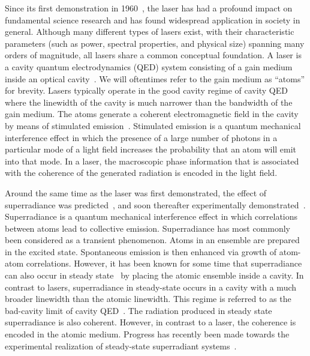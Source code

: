 \documentclass[aps,
twocolumn,
showpacs,
superscriptaddress,groupedaddress]{revtex4}
\begin{document}
Since its first demonstration in 1960~\cite{maiman1960stimulated}, the
laser has had a profound impact on fundamental science research and
has found widespread application in society in general.  Although many
different types of lasers exist, with their characteristic parameters
(such as power, spectral properties, and physical size) spanning many
orders of magnitude, all lasers share a common conceptual foundation.
A laser is a cavity quantum electrodynamics (QED) system consisting of
a gain medium inside an optical cavity~\cite{meystre2007elements}.  We
will oftentimes refer to the gain medium as ``atoms'' for brevity.
Lasers typically operate in the good cavity regime of cavity QED where
the linewidth of the cavity is much narrower than the bandwidth of the
gain medium.  The atoms generate a coherent electromagnetic field in
the cavity by means of stimulated emission~\cite{PhysRev.112.1940}.
Stimulated emission is a quantum mechanical interference effect in
which the presence of a large number of photons in a particular mode
of a light field increases the probability that an atom will emit into
that mode. In a laser, the macroscopic phase information that is
associated with the coherence of the generated radiation is encoded in
the light field.

Around the same time as the laser was first demonstrated, the effect
of superradiance was predicted~\cite{PhysRev.93.99}, and soon
thereafter experimentally demonstrated~\cite{harocheSuperradiance}.
Superradiance is a quantum mechanical interference effect in which
correlations between atoms lead to collective emission.  Superradiance
has most commonly been considered as a transient phenomenon.  Atoms in
an ensemble are prepared in the excited state.  Spontaneous emission
is then enhanced via growth of atom-atom correlations.  However, it
has been known for some time that superradiance can also occur in
steady state~\cite{PhysRevLett.102.163601, PhysRevA.81.033847,
  PhysRevA.81.063827,PhysRevLett.89.253003} by placing the atomic
ensemble inside a cavity.  In contrast to lasers, superradiance in
steady-state occurs in a cavity with a much broader linewidth than the
atomic linewidth.  This regime is referred to as the bad-cavity limit
of cavity QED~\cite{PhysRevA.51.809, PhysRevLett.72.3815,
  ChenDeliciousLaser, HakenLaser, HakenLaserBook}.  The radiation
produced in steady state superradiance is also coherent.  However, in
contrast to a laser, the coherence is encoded in the atomic medium.
Progress has recently been made towards the experimental realization
of steady-state superradiant
systems~\cite{ThompsonPaper,bohnet2012relaxation,Norcia:Crossover}.
\end{document}
